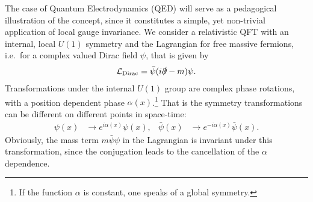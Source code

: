 \label{sec:qedu1}
\label{sec:ymlagrang}
The case of Quantum Electrodynamics (QED) will serve as a
pedagogical illustration of the concept, since it constitutes a
simple, yet non-trivial application of local gauge invariance. We consider a relativistic QFT with an internal, local $U(1)$ symmetry and
the Lagrangian for free massive fermions, i.e.\ for a complex valued Dirac field
$\psi$, that is given by
\begin{align}
  \mathcal{L}_{\text{Dirac}} = \bar{\psi}(i\slashed{\partial}-m)\psi.\label{eq:diraclag}
\end{align}
Transformations under the internal $U(1)$ group are complex phase
rotations, with a position dependent phase $\alpha(x)$.\footnote{If the
function $\alpha$ is constant, one speaks of a global symmetry.} That is the
symmetry transformations can be different on different points in space-time:
\begin{align}\label{eq:diractrafo}
  \psi(x) &\rightarrow e^{i\alpha(x)}\psi(x),&  \bar{\psi}(x) &\rightarrow e^{-i\alpha(x)}\bar{\psi}(x).
\end{align}
Obviously, the mass term $m\bar{\psi}\psi$ in
the Lagrangian is invariant under this transformation, since the conjugation leads to
the cancellation of the $\alpha$ dependence.

